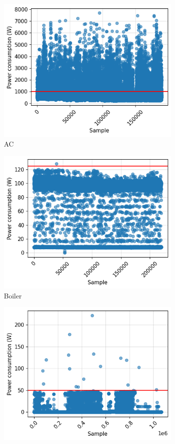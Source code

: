 \begin{figure}
  \begin{subfigure}{.5\textwidth}
    \centering
    \includegraphics[width=.9\linewidth]{images/raw_consumptions/ac.png}
    \caption{AC}
    \label{fig:ac}
  \end{subfigure}%
  \begin{subfigure}{.5\textwidth}
    \centering
    \includegraphics[width=.9\linewidth]{images/raw_consumptions/boiler.png}
    \caption{Boiler}
    \label{fig:boiler}
  \end{subfigure}
  \begin{subfigure}{\textwidth}
    \centering
    \includegraphics[width=.42\linewidth]{images/raw_consumptions/lamp.png}

\end{subfigure}
\end{figure}
